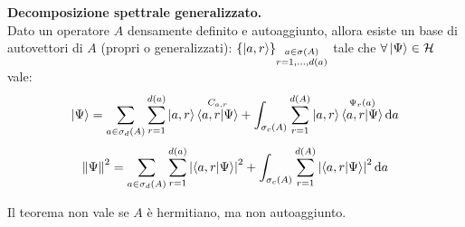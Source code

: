 \begin{theorem}
    {\normalfont \textbf{Decomposizione spettrale generalizzato.}}\\
    Dato un operatore \(A\) densamente definito e autoaggiunto, allora esiste un base di autovettori di \(A\) (propri o generalizzati):
    \(
        \left\{ \ket{a, r} \right\}_{\substack{a \in \sigma(A)\\ r = 1,\dots,d(a)}}
    \) tale che \(\forall \ket{\Psi} \in \mathcal{H}\) vale:
    \begin{equation}
        \ket{\Psi}= \sum_{a \in \sigma_d(A)} \sum_{r=1}^{d(a)} \ket{a,r}\overset{C_{a,r}}{\braket{a,r}{\Psi}} +
        \int_{\sigma_c(A)}\sum_{r=1}^{d(A)}\ket{a,r}\overset{\Psi_r(a)}{\braket{a,r}{\Psi}}\dd{a}
    \end{equation}
    \begin{equation}
        \norm{\Psi}^2=\sum_{a \in \sigma_d(A)} \sum_{r=1}^{d(a)} \abs{\braket{a,r}{\Psi}}^2 +
        \int_{\sigma_c(A)}\sum_{r=1}^{d(A)}\abs{\braket{a,r}{\Psi}}^2\dd{a}
    \end{equation}

\end{theorem}

\begin{attention}
    Il teorema non vale se \(A\) è hermitiano, ma non autoaggiunto.
\end{attention}

